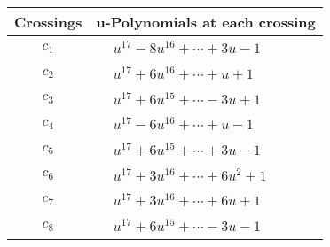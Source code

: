 \documentclass[1p]{elsarticle_modified}
\theoremstyle{definition}
\begin{document}
\begin{tabular}{m{50pt}|m{274pt}}
Crossings & \hspace{64pt}u-Polynomials at each crossing \\
\hline $$\begin{aligned}c_{1}\end{aligned}$$&$\begin{aligned}
&u^{17}-8 u^{16}+\cdots+3 u-1
\end{aligned}$\\
\hline $$\begin{aligned}c_{2}\end{aligned}$$&$\begin{aligned}
&u^{17}+6 u^{16}+\cdots+u+1
\end{aligned}$\\
\hline $$\begin{aligned}c_{3}\end{aligned}$$&$\begin{aligned}
&u^{17}+6 u^{15}+\cdots-3 u+1
\end{aligned}$\\
\hline $$\begin{aligned}c_{4}\end{aligned}$$&$\begin{aligned}
&u^{17}-6 u^{16}+\cdots+u-1
\end{aligned}$\\
\hline $$\begin{aligned}c_{5}\end{aligned}$$&$\begin{aligned}
&u^{17}+6 u^{15}+\cdots+3 u-1
\end{aligned}$\\
\hline $$\begin{aligned}c_{6}\end{aligned}$$&$\begin{aligned}
&u^{17}+3 u^{16}+\cdots+6 u^2+1
\end{aligned}$\\
\hline $$\begin{aligned}c_{7}\end{aligned}$$&$\begin{aligned}
&u^{17}+3 u^{16}+\cdots+6 u+1
\end{aligned}$\\
\hline $$\begin{aligned}c_{8}\end{aligned}$$&$\begin{aligned}
&u^{17}+6 u^{15}+\cdots-3 u-1
\end{aligned}$\\

\end{tabular}
\end{document}
